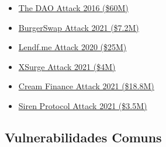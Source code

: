 \begin{itemize}


   \item \href{https://www.gemini.com/pt-br/cryptopedia/the-dao-hack-makerdao\#section-origins-of-the-dao}{The DAO Attack 2016 (\$60M)}
 
   \item \href{https://quillhashteam.medium.com/burgerswap-flash-loan-attack-analysis-888b1911daef}{BurgerSwap Attack 2021 (\$7.2M)}
 
   \item \href{https://www.zdnet.com/article/hackers-steal-25-million-worth-of-cryptocurrency-from-uniswap-and-lendf-me/}{Lendf.me Attack 2020 (\$25M)}
 
    \item \href{https://beosin.medium.com/a-sweet-blow-fb0a5e08657d}{XSurge Attack 2021 (\$4M)}
 
   \item\href{https://www.coindesk.com/business/2021/10/27/cream-finance-exploited-in-flash-loan-attack-worth-over-100m/}{Cream Finance Attack 2021 (\$18.8M)}
 
   \item \href{https://www.halborn.com/blog/post/explained-the-siren-protocol-hack-september-2021}{Siren Protocol Attack 2021 (\$3.5M)}


\end{itemize}

 
\subsection{Vulnerabilidades Comuns}

